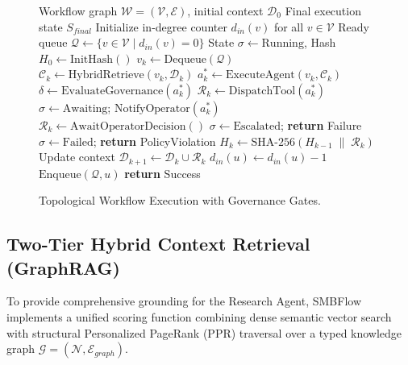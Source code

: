 \documentclass[conference]{IEEEtran}
\begin{document}
\begin{figure}[htbp]
\begin{minipage}{\linewidth}
\begin{algorithmic}[1]
\REQUIRE Workflow graph $\mathcal{W} = (\mathcal{V}, \mathcal{E})$, initial context $\mathcal{D}_0$
\ENSURE Final execution state $S_{final}$
\STATE Initialize in-degree counter $d_{in}(v)$ for all $v \in \mathcal{V}$
\STATE Ready queue $\mathcal{Q} \leftarrow \{v \in \mathcal{V} \mid d_{in}(v) = 0\}$
\STATE State $\sigma \leftarrow \text{Running}$, Hash $H_0 \leftarrow \text{InitHash}()$
    \STATE $v_k \leftarrow \text{Dequeue}(\mathcal{Q})$
    \STATE $\mathcal{C}_k \leftarrow \text{HybridRetrieve}(v_k, \mathcal{D}_k)$
    \STATE $a_k^* \leftarrow \text{ExecuteAgent}(v_k, \mathcal{C}_k)$
    \STATE $\delta \leftarrow \text{EvaluateGovernance}(a_k^*)$
        \STATE $\mathcal{R}_k \leftarrow \text{DispatchTool}(a_k^*)$
        \STATE $\sigma \leftarrow \text{Awaiting}$; $\text{NotifyOperator}(a_k^*)$
        \STATE $\mathcal{R}_k \leftarrow \text{AwaitOperatorDecision}()$
            \STATE $\sigma \leftarrow \text{Escalated}$; \textbf{return} Failure
        \ENDIF
    \ELSE
        \STATE $\sigma \leftarrow \text{Failed}$; \textbf{return} PolicyViolation
    \ENDIF
    \STATE $H_k \leftarrow \text{SHA-256}(H_{k-1} \;\|\; \mathcal{R}_k)$
    \STATE Update context $\mathcal{D}_{k+1} \leftarrow \mathcal{D}_k \cup \mathcal{R}_k$
        \STATE $d_{in}(u) \leftarrow d_{in}(u) - 1$
            \STATE $\text{Enqueue}(\mathcal{Q}, u)$
        \ENDIF
    \ENDFOR
\ENDWHILE
\STATE \textbf{return} Success
\end{algorithmic}
\end{minipage}
\caption{Topological Workflow Execution with Governance Gates.}
\label{alg:dag_execution}
\end{figure}

\subsection{Two-Tier Hybrid Context Retrieval (GraphRAG)}
To provide comprehensive grounding for the Research Agent, SMBFlow implements a unified scoring function combining dense semantic vector search with structural Personalized PageRank (PPR) traversal over a typed knowledge graph $\mathcal{G} = (\mathcal{N}, \mathcal{E}_{graph})$.
\end{document}
